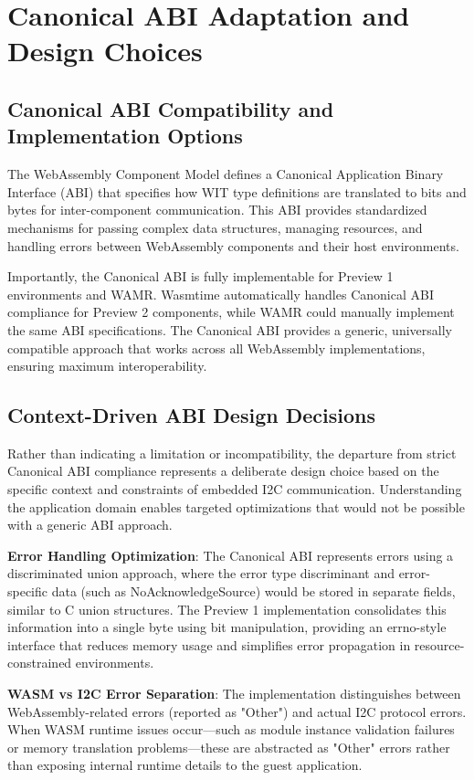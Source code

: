 \section{Canonical ABI Adaptation and Design Choices}
\label{sec:canonical-abi-adaptation}

\subsection{Canonical ABI Compatibility and Implementation Options}

The WebAssembly Component Model defines a Canonical Application Binary Interface (ABI) that specifies how WIT type definitions are translated to bits and bytes for inter-component communication. This ABI provides standardized mechanisms for passing complex data structures, managing resources, and handling errors between WebAssembly components and their host environments.

Importantly, the Canonical ABI is fully implementable for Preview 1 environments and WAMR. Wasmtime automatically handles Canonical ABI compliance for Preview 2 components, while WAMR could manually implement the same ABI specifications. The Canonical ABI provides a generic, universally compatible approach that works across all WebAssembly implementations, ensuring maximum interoperability.

\subsection{Context-Driven ABI Design Decisions}

Rather than indicating a limitation or incompatibility, the departure from strict Canonical ABI compliance represents a deliberate design choice based on the specific context and constraints of embedded I2C communication. Understanding the application domain enables targeted optimizations that would not be possible with a generic ABI approach.

\textbf{Error Handling Optimization}: The Canonical ABI represents errors using a discriminated union approach, where the error type discriminant and error-specific data (such as NoAcknowledgeSource) would be stored in separate fields, similar to C union structures. The Preview 1 implementation consolidates this information into a single byte using bit manipulation, providing an errno-style interface that reduces memory usage and simplifies error propagation in resource-constrained environments.

\textbf{WASM vs I2C Error Separation}: The implementation distinguishes between WebAssembly-related errors (reported as "Other") and actual I2C protocol errors. When WASM runtime issues occur—such as module instance validation failures or memory translation problems—these are abstracted as "Other" errors rather than exposing internal runtime details to the guest application.

